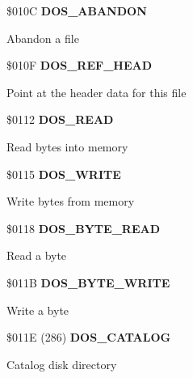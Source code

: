 \$010C \textbf{DOS\_ABANDON}

Abandon a file

\$010F \textbf{DOS\_REF\_HEAD}

Point at the header data for this file

\$0112 \textbf{DOS\_READ}

Read bytes into memory

\$0115 \textbf{DOS\_WRITE}

Write bytes from memory

\$0118 \textbf{DOS\_BYTE\_READ}

Read a byte

\$011B \textbf{DOS\_BYTE\_WRITE}

Write a byte

\$011E (286) \textbf{DOS\_CATALOG}

Catalog disk directory

%

